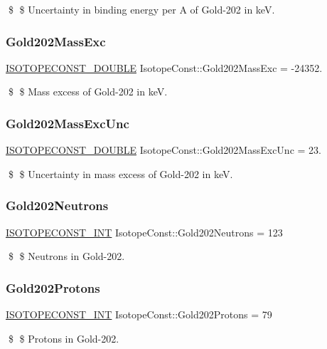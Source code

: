 \$ \$ Uncertainty in binding energy per A of Gold-\/202 in keV. \mbox{\label{group___isotope_const-_gold-_au202_gac7eb0fde83228f63f077c18ec447e559}} 
\subsubsection{\texorpdfstring{Gold202\+Mass\+Exc}{Gold202MassExc}}
{\footnotesize\ttfamily \mbox{\hyperlink{group___isotope_const-_macros_ga8f45a7272ce02c0b4c65c44636ed719a}{I\+S\+O\+T\+O\+P\+E\+C\+O\+N\+S\+T\+\_\+\+D\+O\+U\+B\+LE}} Isotope\+Const\+::\+Gold202\+Mass\+Exc = -\/24352.}

\$ \$ Mass excess of Gold-\/202 in keV. \mbox{\label{group___isotope_const-_gold-_au202_gac8d4f686e4ece0116f3bc06b8edf2d6e}} 
\subsubsection{\texorpdfstring{Gold202\+Mass\+Exc\+Unc}{Gold202MassExcUnc}}
{\footnotesize\ttfamily \mbox{\hyperlink{group___isotope_const-_macros_ga8f45a7272ce02c0b4c65c44636ed719a}{I\+S\+O\+T\+O\+P\+E\+C\+O\+N\+S\+T\+\_\+\+D\+O\+U\+B\+LE}} Isotope\+Const\+::\+Gold202\+Mass\+Exc\+Unc = 23.}

\$ \$ Uncertainty in mass excess of Gold-\/202 in keV. \mbox{\label{group___isotope_const-_gold-_au202_ga5f01183640d2bcec6f9598e771754828}} 
\subsubsection{\texorpdfstring{Gold202\+Neutrons}{Gold202Neutrons}}
{\footnotesize\ttfamily \mbox{\hyperlink{group___isotope_const-_macros_ga5f18360b3e99483a35c32d789e62621c}{I\+S\+O\+T\+O\+P\+E\+C\+O\+N\+S\+T\+\_\+\+I\+NT}} Isotope\+Const\+::\+Gold202\+Neutrons = 123}

\$ \$ Neutrons in Gold-\/202. \mbox{\label{group___isotope_const-_gold-_au202_ga78fb995402167d828d545c2cb603f09c}} 
\subsubsection{\texorpdfstring{Gold202\+Protons}{Gold202Protons}}
{\footnotesize\ttfamily \mbox{\hyperlink{group___isotope_const-_macros_ga5f18360b3e99483a35c32d789e62621c}{I\+S\+O\+T\+O\+P\+E\+C\+O\+N\+S\+T\+\_\+\+I\+NT}} Isotope\+Const\+::\+Gold202\+Protons = 79}

\$ \$ Protons in Gold-\/202. 
